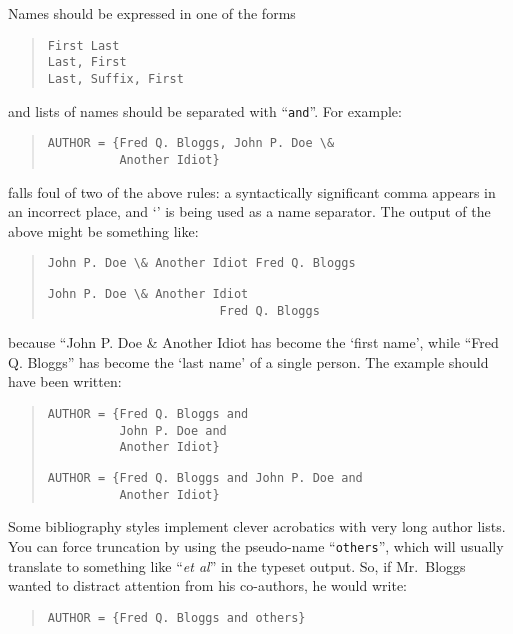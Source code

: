Names should be expressed in one of the forms
\begin{quote}
\begin{verbatim}
First Last
Last, First
Last, Suffix, First
\end{verbatim}
\end{quote}
and lists of names should be separated with ``\texttt{and}''.
For example:
\begin{quote}
\begin{verbatim}
AUTHOR = {Fred Q. Bloggs, John P. Doe \&
          Another Idiot}
\end{verbatim}
\end{quote}
falls foul of two of the above rules: a syntactically significant
comma appears in an incorrect place, and `\csx{\&}' is being used as a
name separator.  The output of the above might be something like:
\begin{quote}
\begin{wideversion}
\begin{verbatim}
John P. Doe \& Another Idiot Fred Q. Bloggs
\end{verbatim}
\end{wideversion}
\begin{narrowversion}
\begin{verbatim}
John P. Doe \& Another Idiot
                        Fred Q. Bloggs
\end{verbatim}
\end{narrowversion}
\end{quote}
because ``John P. Doe \& Another Idiot has become the `first name',
while ``Fred Q. Bloggs'' has become the `last name' of a single
person.  The example should have been written:
\begin{quote}
\begin{narrowversion}
\begin{verbatim}
AUTHOR = {Fred Q. Bloggs and
          John P. Doe and
          Another Idiot}
\end{verbatim}
\end{narrowversion}
\begin{wideversion}
\begin{verbatim}
AUTHOR = {Fred Q. Bloggs and John P. Doe and
          Another Idiot}
\end{verbatim}
\end{wideversion}
\end{quote}
Some bibliography styles implement clever acrobatics with very long
author lists.  You can force truncation by using the pseudo-name
``\texttt{others}'', which will usually translate to something like
``\emph{et al}'' in the typeset output.  So, if Mr.~Bloggs wanted to
distract attention from his co-authors, he would write:
\begin{quote}
\begin{verbatim}
AUTHOR = {Fred Q. Bloggs and others}
\end{verbatim}
\end{quote}

